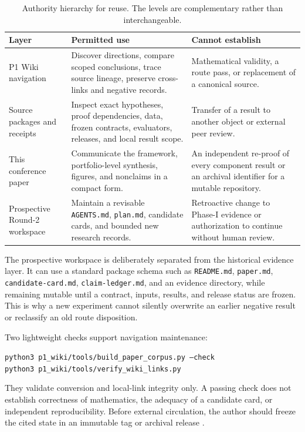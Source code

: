 \begin{table}[H]
\centering
\caption{Authority hierarchy for reuse. The levels are complementary rather
than interchangeable.}
\label{tab:authority}
\small
\begin{tabularx}{\linewidth}{@{}p{.27\linewidth}Yp{.24\linewidth}@{}}
\toprule
\textbf{Layer} & \textbf{Permitted use} & \textbf{Cannot establish} \\
\midrule
P1 Wiki navigation & Discover directions, compare scoped conclusions, trace
source lineage, preserve cross-links and negative records. & Mathematical
validity, a route pass, or replacement of a canonical source. \\
Source packages and receipts & Inspect exact hypotheses, proof dependencies,
data, frozen contracts, evaluators, releases, and local result scope. &
Transfer of a result to another object or external peer review. \\
This conference paper & Communicate the framework, portfolio-level synthesis,
figures, and nonclaims in a compact form. & An independent re-proof of every
component result or an archival identifier for a mutable repository. \\
Prospective Round-2 workspace & Maintain a revisable \texttt{AGENTS.md},
\texttt{plan.md}, candidate cards, and bounded new research records. &
Retroactive change to Phase-I evidence or authorization to continue without
human review. \\
\bottomrule
\end{tabularx}
\end{table}

The prospective workspace is deliberately separated from the historical
evidence layer. It can use a standard package schema such as
\texttt{README.md}, \texttt{paper.md}, \texttt{candidate-card.md},
\texttt{claim-ledger.md}, and an evidence directory, while remaining mutable
until a contract, inputs, results, and release status are frozen. This is why a
new experiment cannot silently overwrite an earlier negative result or
reclassify an old route disposition.

Two lightweight checks support navigation maintenance:
\begin{center}
\small
\texttt{python3 p1\_wiki/tools/build\_paper\_corpus.py --check}\\
\texttt{python3 p1\_wiki/tools/verify\_wiki\_links.py}
\end{center}
They validate conversion and local-link integrity only. A passing check does
not establish correctness of mathematics, the adequacy of a candidate card, or
independent reproducibility. Before external circulation, the author should
freeze the cited state in an immutable tag or archival release
\citep{PhaseIRepository}.

